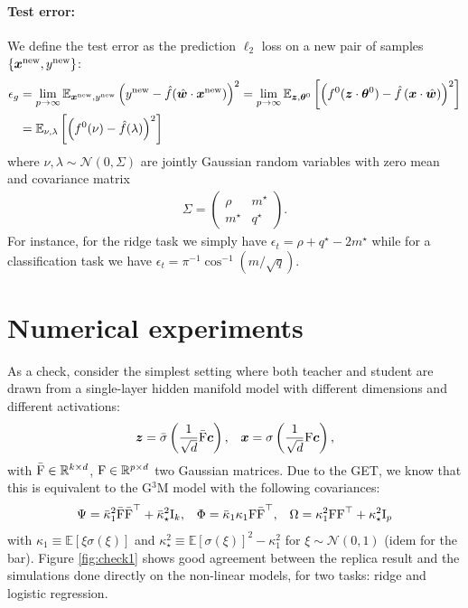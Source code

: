 \documentclass[11pt]{article}
\numberwithin{equation}{section}
\begin{document}
\paragraph{Test error: } We define the test error as the prediction $\ell_{2}$ loss on a new pair of samples $\{\vec{x}^{\rm{new}}, y^{\rm{new}}\}$:
\begin{align}
	\epsilon_{g} &= \lim\limits_{p\to\infty}\mathbb{E}_{\vec{x}^{\rm{new}},y^{\rm{new}}}\left(y^{\rm{new}}-\hat{f}(\hat{\vec{w}}\cdot\vec{x}^{\rm{new}})\right)^2 =\lim\limits_{p\to\infty}\mathbb{E}_{\vec{z}, \vec{\theta}^{0}}\left[\left(f^{0}(\vec{z}\cdot\vec{\theta}^{0})-\hat{f}\left(\vec{x}\cdot\hat{\vec{w}}\right)\right)^2\right]\notag\\
	&=\mathbb{E}_{\nu,\lambda}\left[\left(f^{0}(\nu)-\hat{f}(\lambda)\right)^2\right]
\end{align}
\noindent where $\nu,\lambda\sim\mathcal{N}(0,\Sigma)$ are jointly Gaussian random variables with zero mean and covariance matrix
\begin{align}
\Sigma = 
\begin{pmatrix}
 	\rho & m^{\star}\\
 	m^{\star} & q^{\star}
\end{pmatrix}.
\end{align}
For instance, for the ridge task we simply have $\epsilon_{t} = \rho+q^{\star}-2m^{\star}$ while for a classification task we have $\epsilon_{t}=\pi^{-1}\cos^{-1}\left(m/\sqrt{q}\right)$.

\section{Numerical experiments}
As a check, consider the simplest setting where both teacher and student are drawn from a single-layer hidden manifold model with different dimensions and different activations:
\begin{align}
\vec{z} = \bar{\sigma}\left(\frac{1}{\sqrt{d}}\bar{\mat{F}}\vec{c}\right), && \vec{x} = \sigma\left(\frac{1}{\sqrt{d}}\mat{F}\vec{c}\right),
\label{eq:check1}
\end{align}
 \noindent with $\bar{\mat{F}} \in\mathbb{R}^{k\times d}$,  $\mat{F} \in\mathbb{R}^{p\times d}$ two Gaussian matrices. Due to the GET, we know that this is equivalent to the G$^3$M model with the following covariances:
 \begin{align}
 	\Psi = \bar{\kappa}_{1}^2 \bar{\mat{F}}\bar{\mat{F}}^{\top}+\bar{\kappa}_{\star}^2\mat{I}_{k}, && \Phi = \bar{\kappa}_{1}\kappa_{1} \mat{F}\bar{\mat{F}}^{\top}, && \Omega = \kappa_{1}^2 \mat{F}\mat{F}^{\top}+\kappa_{\star}^2\mat{I}_{p}
 \end{align}
 \noindent with $\kappa_{1} \equiv \mathbb{E}\left[\xi\sigma(\xi)\right]$ and $\kappa_{\star}^2 \equiv \mathbb{E}\left[\sigma(\xi)\right]^2-\kappa_{1}^2$ for $\xi\sim\mathcal{N}(0,1)$ (idem for the bar). Figure \ref{fig:check1} shows good agreement between the replica result and the simulations done directly on the non-linear models, for two tasks: ridge and logistic regression.
 
\end{document}
